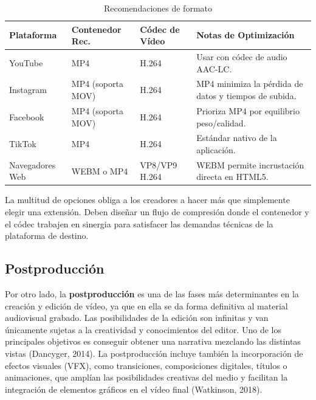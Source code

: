 \vspace{0.5cm}
\begin{table}[H]
\centering
\begin{tabular}{|p{3cm}|p{3.5cm}|p{3cm}|p{5cm}|}
\hline
\textbf{Plataforma} & \textbf{Contenedor Rec.} & \textbf{Códec de Vídeo} & \textbf{Notas de Optimización} \\ \hline
YouTube & MP4 & H.264 & Usar con códec de audio AAC-LC. \\ \hline
Instagram & MP4 (soporta MOV) & H.264 & MP4 minimiza la pérdida de datos y tiempos de subida. \\ \hline
Facebook & MP4 (soporta MOV) & H.264 & Prioriza MP4 por equilibrio peso/calidad. \\ \hline
TikTok & MP4 & H.264 & Estándar nativo de la aplicación. \\ \hline
Navegadores Web & WEBM o MP4 & VP8/VP9 H.264 & WEBM permite incrustación directa en HTML5. \\ \hline
\end{tabular}
\caption{Recomendaciones de formato}
\label{tab:eleccion-formato}
\end{table}
\vspace{0.5cm}


La multitud de opciones obliga a los creadores a hacer más que simplemente elegir 
una extensión. Deben diseñar un flujo de compresión donde el contenedor y el códec trabajen en sinergia 
para satisfacer las demandas técnicas de la plataforma de destino.



 \subsection{Postproducción}
 Por otro lado, la \textbf{postproducción} es una de las fases más determinantes en la creación y edición de vídeo, ya que en ella se da forma definitiva al material audiovisual grabado. Las posibilidades de la edición son infinitas y van únicamente sujetas a la creatividad y conocimientos del editor. Uno de los principales objetivos es conseguir obtener una narrativa mezclando las distintas vistas (Dancyger, 2014)\cite{conceptos-basicos-2}. La postproducción incluye también la incorporación de efectos visuales (VFX), como transiciones, composiciones digitales, títulos o animaciones, que amplían las posibilidades creativas del medio y facilitan la integración de elementos gráficos en el vídeo final (Watkinson, 2018)\cite{conceptos-basicos-4}.

